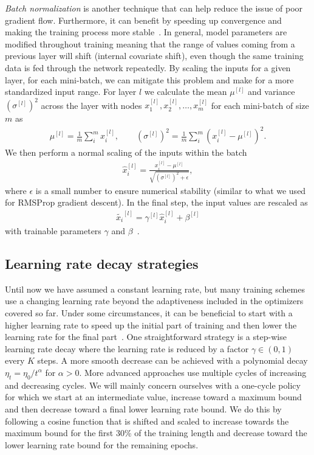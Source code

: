 \textit{Batch normalization} is another technique that can help reduce the issue of poor gradient flow. Furthermore, it can benefit by speeding up convergence and making the training process more stable~\cite{ioffe2015batch}. In general, model parameters are modified throughout training meaning that the range of values coming from a previous layer will shift (internal covariate shift), even though the same training data is fed through the network repeatedly. By scaling the inputs for a given layer, for each mini-batch, we can mitigate this problem and make for a more standardized input range. For layer $l$ we calculate the mean $\mu^{[l]}$ and variance $(\sigma^{[l]})^{2}$ across the layer with nodes $x_1^{[l]}, x_2^{[l]}, \ldots, x_m^{[l]}$ for each mini-batch of size $m$ as
\begin{align*}
  \mu^{[l]} = \frac{1}{m} \sum_i^m x_i^{[l]}, \qquad (\sigma^{[l]})^{2} = \frac{1}{m} \sum_i^m (x_i^{[l]}-\mu^{[l]})^2.
\end{align*}
We then perform a normal scaling of the inputs within the batch
\begin{align*}
  \hat{x}_i^{[l]} = \frac{x_i^{[l]} - \mu^{[l]}}{\sqrt{(\sigma^{[l]})^{2} + \epsilon}},
\end{align*}
where $\epsilon$ is a small number to ensure numerical stability (similar to what we used for \acrshort{RMSProp} gradient descent). In the final step, the input values are rescaled as
\begin{align*}
  \tilde{x_i}^{[l]} = \gamma^{[l]} \hat{x}_i^{[l]} + \beta^{[l]}
\end{align*}
with trainable parameters $\gamma$ and $\beta$~\cite{ioffe2015batch}. 

\subsection{Learning rate decay strategies}
Until now we have assumed a constant learning rate, but many training schemes use a changing learning rate beyond the adaptiveness included in the optimizers covered so far. Under some circumstances, it can be beneficial to start with a higher learning rate to speed up the initial part of training and then lower the learning rate for the final part~\cite{smith2018disciplined}. One straightforward strategy is a step-wise learning rate decay where the learning rate is reduced by a factor $\gamma \in (0,1)$ every $K$ steps. A more smooth decrease can be achieved with a polynomial decay $\eta_t = \eta_0/t^{\alpha}$ for $\alpha > 0$. More advanced approaches use multiple cycles of increasing and decreasing cycles. We will mainly concern ourselves with a one-cycle policy for which we start at an
intermediate value, increase toward a maximum bound and then decrease toward a
final lower learning rate bound. We do this by following a cosine function that is shifted and scaled to increase towards the maximum bound for the first 30\% of the training length and decrease toward the lower learning rate bound for the remaining epochs. 



